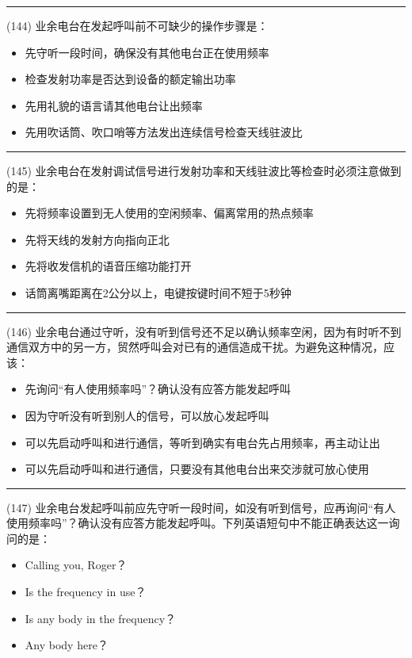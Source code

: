 \documentclass[twocolumn]{ctexart}  %
\begin{document}
\noindent\rule{0.5\textwidth}{1pt}
\heiti (144) 业余电台在发起呼叫前不可缺少的操作步骤是： \songti {\color{gray} [LK0232] }
\begin{itemize}
	\item  先守听一段时间，确保没有其他电台正在使用频率
	\item  检查发射功率是否达到设备的额定输出功率
	\item  先用礼貌的语言请其他电台让出频率
	\item  先用吹话筒、吹口哨等方法发出连续信号检查天线驻波比
\end{itemize}


\noindent\rule{0.5\textwidth}{1pt}
\heiti (145) 业余电台在发射调试信号进行发射功率和天线驻波比等检查时必须注意做到的是： \songti {\color{gray} [LK0233] }
\begin{itemize}
	\item  先将频率设置到无人使用的空闲频率、偏离常用的热点频率
	\item  先将天线的发射方向指向正北
	\item  先将收发信机的语音压缩功能打开
	\item  话筒离嘴距离在2公分以上，电键按键时间不短于5秒钟
\end{itemize}


\noindent\rule{0.5\textwidth}{1pt}
\heiti (146) 业余电台通过守听，没有听到信号还不足以确认频率空闲，因为有时听不到通信双方中的另一方，贸然呼叫会对已有的通信造成干扰。为避免这种情况，应该： \songti {\color{gray} [LK0235] }
\begin{itemize}
	\item  先询问“有人使用频率吗”？确认没有应答方能发起呼叫
	\item  因为守听没有听到别人的信号，可以放心发起呼叫
	\item  可以先启动呼叫和进行通信，等听到确实有电台先占用频率，再主动让出
	\item  可以先启动呼叫和进行通信，只要没有其他电台出来交涉就可放心使用
\end{itemize}


\noindent\rule{0.5\textwidth}{1pt}
\heiti (147) 业余电台发起呼叫前应先守听一段时间，如没有听到信号，应再询问“有人使用频率吗”？确认没有应答方能发起呼叫。下列英语短句中不能正确表达这一询问的是： \songti {\color{gray} [LK0236] }
\begin{itemize}
	\item  Calling you, Roger？
	\item  Is the frequency in use？
	\item  Is any body in the frequency？
	\item  Any body here？
\end{itemize}
\end{document}
